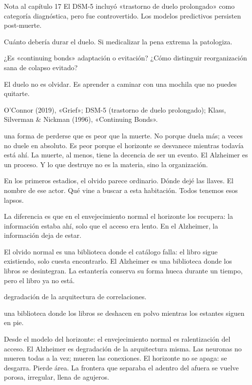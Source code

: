 \begin{notacap}{Nota al capítulo 17}
 El DSM-5 incluyó «trastorno de duelo prolongado» como categoría diagnóstica, pero fue controvertido. Los modelos predictivos persisten post-muerte.

 Cuánto debería durar el duelo. Si medicalizar la pena extrema la patologiza.

 ¿Es «continuing bonds» adaptación o evitación? ¿Cómo distinguir reorganización sana de colapso evitado?

 El duelo no es olvidar. Es aprender a caminar con una mochila que no puedes quitarte.

 O’Connor (2019), «Grief»; DSM-5 (trastorno de duelo prolongado); Klass, Silverman \& Nickman (1996), «Continuing Bonds».
\end{notacap}
\noindent {} una forma de perderse que es peor que la muerte. No porque duela más; a veces no duele en absoluto. Es peor porque el horizonte se desvanece mientras todavía está ahí. La muerte, al menos, tiene la decencia de ser un evento. El Alzheimer es un proceso. Y lo que destruye no es la materia, sino la organización.

\noindent En los primeros estadios, el olvido parece ordinario. Dónde dejé las llaves. El nombre de ese actor. Qué vine a buscar a esta habitación. Todos tenemos esos lapsos.

La diferencia es que en el envejecimiento normal el horizonte los recupera: la información estaba ahí, solo que el acceso era lento. En el Alzheimer, la información deja de estar.

El olvido normal es una biblioteca donde el catálogo falla: el libro sigue existiendo, solo cuesta encontrarlo. El Alzheimer es una biblioteca donde los libros se desintegran. La estantería conserva su forma hueca durante un tiempo, pero el libro ya no está.

\begin{fisica}
 degradación de la arquitectura de correlaciones.

 una biblioteca donde los libros se deshacen en polvo mientras los estantes siguen en pie.
\end{fisica}
Desde el modelo del horizonte: el envejecimiento normal es ralentización del acceso. El Alzheimer es degradación de la arquitectura misma. Las neuronas no mueren todas a la vez; mueren las conexiones. El horizonte no se apaga: se desgarra. Pierde área. La frontera que separaba el adentro del afuera se vuelve porosa, irregular, llena de agujeros.

